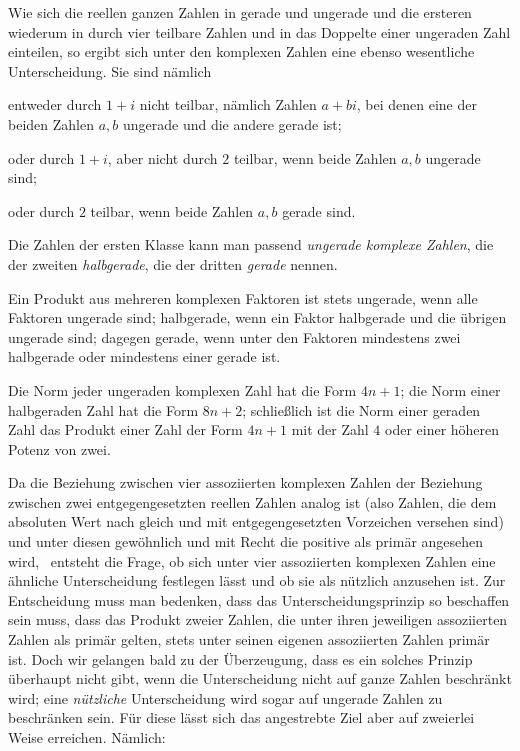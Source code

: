 Wie sich die reellen ganzen Zahlen in gerade und ungerade und die ersteren wiederum in durch vier teilbare Zahlen und in das Doppelte einer ungeraden Zahl einteilen, so ergibt sich unter den komplexen Zahlen eine ebenso wesentliche Unterscheidung. Sie sind nämlich

entweder durch $1+i$ nicht teilbar, nämlich Zahlen $a+bi$, bei denen eine der beiden Zahlen $a,b$ ungerade und die andere gerade ist;

oder durch $1+i$, aber nicht durch $2$ teilbar, wenn beide Zahlen $a,b$ ungerade sind;

oder durch $2$ teilbar, wenn beide Zahlen $a,b$ gerade sind.

Die Zahlen der ersten Klasse kann man passend \emph{ungerade komplexe Zahlen}, die der zweiten \emph{halbgerade}, die der dritten \emph{gerade} nennen.

Ein Produkt aus mehreren komplexen Faktoren ist stets ungerade, wenn alle Faktoren ungerade sind; halbgerade, wenn ein Faktor halbgerade und die übrigen ungerade sind; dagegen gerade, wenn unter den Faktoren mindestens zwei halbgerade oder mindestens einer gerade ist.

Die Norm jeder ungeraden komplexen Zahl hat die Form $4n+1$; die Norm einer halbgeraden Zahl hat die Form $8n+2$; schließlich ist die Norm einer geraden Zahl das Produkt einer Zahl der Form $4n+1$ mit der Zahl $4$ oder einer höheren Potenz von zwei.

Da die Beziehung zwischen vier assoziierten komplexen Zahlen der Beziehung zwischen zwei entgegengesetzten reellen Zahlen analog ist (also Zahlen, die dem absoluten Wert nach gleich und mit entgegengesetzten Vorzeichen versehen sind) und unter diesen gewöhnlich und mit Recht die positive als primär angesehen wird,\ %
entsteht die Frage, ob sich unter vier assoziierten komplexen Zahlen eine ähnliche Unterscheidung festlegen lässt und ob sie als nützlich anzusehen ist. Zur Entscheidung muss man bedenken, dass das Unterscheidungsprinzip so beschaffen sein muss, dass das Produkt zweier Zahlen, die unter ihren jeweiligen assoziierten Zahlen als primär gelten, stets unter seinen eigenen assoziierten Zahlen primär ist. Doch wir gelangen bald zu der Überzeugung, dass es ein solches Prinzip überhaupt nicht gibt, wenn die Unterscheidung nicht auf ganze Zahlen beschränkt wird; eine \emph{nützliche} Unterscheidung wird sogar auf ungerade Zahlen zu beschränken sein. Für diese lässt sich das angestrebte Ziel aber auf zweierlei Weise erreichen. Nämlich:

